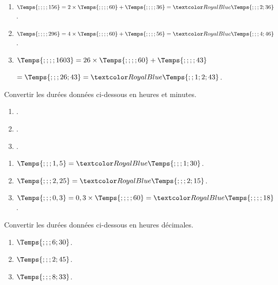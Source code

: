 \begin{Maquette}[Fiche,CorrigeFin,Colonnes=2]{}
\begin{multicols}{2}
      \begin{Solution}
         \begin{enumerate}
            \item $\Temps{;;;;156} =2\times\Temps{;;;;60}+\Temps{;;;;36} =\cor{\Temps{;;;2;36}}$.
            \item $\Temps{;;;;296} =4\times\Temps{;;;;60}+\Temps{;;;;56} =\cor{\Temps{;;;4;46}}$.
            \item $\Temps{;;;;1603} =26\times\Temps{;;;;60}+\Temps{;;;;43}$ \par
               \quad $=\Temps{;;;26;43} =\cor{\Temps{;;1;2;43}}$.
         \end{enumerate}
      \end{Solution}
      
      
      \begin{exercice} %
         Convertir les durées données ci-dessous en heures et minutes.
         \begin{enumerate}
            \item {}.
            \item {}.
            \item {}.
         \end{enumerate}
      \end{exercice}
      
      \begin{Solution}
         \begin{enumerate}
            \item $\Temps{;;;1,5} =\cor{\Temps{;;;1;30}}$.
            \item $\Temps{;;;2,25} =\cor{\Temps{;;;2;15}}$.
            \item $\Temps{;;;0,3} =0,3\times\Temps{;;;;60} =\cor{\Temps{;;;;18}}$.
         \end{enumerate}
      \end{Solution}
      
      
      \begin{exercice}[Dur] %
         Convertir les durées données ci-dessous en heures décimales.
         \begin{enumerate}
            \item $\Temps{;;;6;30}$.
            \item $\Temps{;;;2;45}$.
            \item $\Temps{;;;8;33}$.
         \end{enumerate}
      \end{exercice}
      

\end{multicols}
\end{Maquette}
